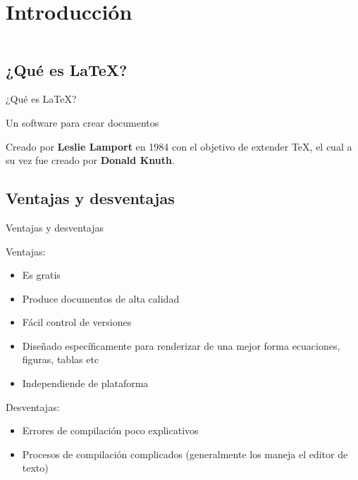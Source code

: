 \section{Introducción}\label{intro}

\begin{frame}
    \begin{columns}[t]
        \begin{column}{.5\textwidth}
          \tableofcontents[sections={1-2},currentsection]
        \end{column}
        \begin{column}{.5\textwidth}
          \tableofcontents[sections={3-4},currentsection]
        \end{column}
    \end{columns}
\end{frame}

\subsection{¿Qué es \LaTeX?}

\begin{frame}{¿Qué es \LaTeX?}
\begin{center}
Un software para crear documentos
\end{center}

\pause

Creado por \textbf{Leslie Lamport} en 1984 con el objetivo de extender \TeX, el
cual a su vez fue creado por \textbf{Donald Knuth}.

\end{frame}


\subsection{Ventajas y desventajas}
\begin{frame}{Ventajas y desventajas}

Ventajas:
\begin{itemize}
  \item Es gratis
  \item Produce documentos de alta calidad
  \item Fácil control de versiones
  \item Diseñado específicamente para renderizar de una mejor forma ecuaciones,
    figuras, tablas etc
  \item Independiende de plataforma
\end{itemize}

\pause

Desventajas:
\begin{itemize}
  \item Errores de compilación poco explicativos
  \item Procesos de compilación complicados (generalmente los maneja el editor
    de texto)
\end{itemize}

\end{frame}

